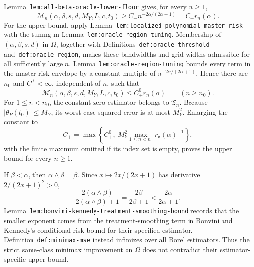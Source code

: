 Lemma~\texttt{lem:all-beta-oracle-lower-floor} gives, for every \(n\ge1\),
\[
\mathcal M_n(\alpha,\beta,s,d,M_Y,L,c,t_0)
\ge C_-n^{-2\alpha/(2\alpha+1)}=C_-r_n(\alpha).
\]
For the upper bound, apply Lemma~\texttt{lem:localized-polynomial-master-risk} with the tuning in Lemma~\texttt{lem:oracle-region-tuning}. Membership of \((\alpha,\beta,s,d)\) in \(\Omega\), together with Definitions~\texttt{def:oracle-threshold} and~\texttt{def:oracle-region}, makes these bandwidths and grid widths admissible for all sufficiently large \(n\). Lemma~\texttt{lem:oracle-region-tuning} bounds every term in the master-risk envelope by a constant multiple of \(n^{-2\alpha/(2\alpha+1)}\). Hence there are \(n_0\) and \(C_+^0<\infty\), independent of \(n\), such that
\[
\mathcal M_n(\alpha,\beta,s,d,M_Y,L,c,t_0)
\le C_+^0r_n(\alpha)
\qquad(n\ge n_0).
\]
For \(1\le n<n_0\), the constant-zero estimator belongs to \(\mathfrak T_n\). Because \(\lvert\theta_P(t_0)\rvert\le M_Y\), its worst-case squared error is at most \(M_Y^2\). Enlarging the constant to
\[
C_+=\max\left\{C_+^0,\ M_Y^2\max_{1\le n<n_0}r_n(\alpha)^{-1}\right\},
\]
with the finite maximum omitted if its index set is empty, proves the upper bound for every \(n\ge1\).

If \(\beta<\alpha\), then \(\alpha\wedge\beta=\beta\). Since \(x\mapsto2x/(2x+1)\) has derivative \(2/(2x+1)^2>0\),
\[
\frac{2(\alpha\wedge\beta)}{2(\alpha\wedge\beta)+1}
=
\frac{2\beta}{2\beta+1}
<
\frac{2\alpha}{2\alpha+1}.
\]
Lemma~\texttt{lem:bonvini-kennedy-treatment-smoothing-bound} records that the smaller exponent comes from the treatment-smoothing term in Bonvini and Kennedy's conditional-risk bound for their specified estimator. Definition~\texttt{def:minimax-mse} instead infimizes over all Borel estimators. Thus the strict same-class minimax improvement on \(\Omega\) does not contradict their estimator-specific upper bound.